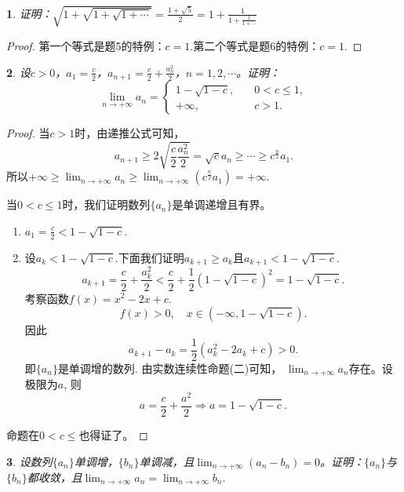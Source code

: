 \documentclass[utf8]{book}
\newtheorem{example}{}[section]             %
\begin{document}
\begin{example}
证明：$\displaystyle \sqrt{1+\sqrt{1+\sqrt{1+\cdots}}}=\frac{1+\sqrt{5}}{2} =  1 + \displaystyle \frac{1}{1+\displaystyle \frac{1}{1+\cdots}}$
\end{example}
\begin{proof}
第一个等式是题5的特例：$c=1$.第二个等式是题6的特例：$c=1$.
\end{proof}
\begin{example}
设$c>0$，$a_1=\frac{c}{2}$，$a_{n+1}=\displaystyle\frac{c}{2}+\frac{a_n^2}{2}$，$n=1,2,\cdots$。证明：
\begin{equation*}
\displaystyle \lim_{n\to +\infty}a_n=
\begin{cases}
1-\sqrt{1-c},\quad&0<c\leq 1,\\
+\infty, \quad&c > 1.
\end{cases}
\end{equation*}
\end{example}
\begin{proof}
当$c>1$时，由递推公式可知，$$a_{n+1}\geq 2\displaystyle\sqrt{\frac{c}{2}{\frac{a_n^2}{2}}}=\sqrt{c}a_n\geq \cdots\geq c^{\frac{n}{2}}a_1.$$
所以$+\infty \geq \displaystyle \lim_{n\to +\infty}a_n \geq \displaystyle \lim_{n\to +\infty}\left(c^{\frac{n}{2}}a_1\right) = +\infty.$

当$0<c\leq 1$时，我们证明数列$\{a_n\}$是单调递增且有界。
\renewcommand\labelenumi{\normalfont(\theenumi)}
\begin{enumerate}
\item $a_1 = \displaystyle\frac{c}{2} < 1-\sqrt{1-c}$.
\item 设$a_k < 1-\sqrt{1-c}$.下面我们证明$a_{k+1} \geq a_{k}$且$a_{k+1} < 1-\sqrt{1-c}$.
$$a_{k+1} = \frac{c}{2} + \frac{a_{k}^2}{2} <\frac{c}{2} + \frac{1}{2}\left(1-\sqrt{1-c}\right)^2 = 1-\sqrt{1-c}.$$
考察函数$f(x) = x^2-2x+c$. $$f(x) > 0, \quad x\in(-\infty, 1-\sqrt{1-c}).$$
因此 $$a_{k+1} - a_{k} = \frac{1}{2}(a_k^2-2a_k+c) > 0.$$
即$\{a_n\}$是单调增的数列. 由实数连续性命题(二)可知， $\displaystyle \lim_{n\to +\infty}a_n$存在。设极限为$a$, 则$$a=\frac{c}{2}+\frac{a^2}{2}\Rightarrow a = 1-\sqrt{1-c}.$$
\end{enumerate}
命题在$0<c\leq$也得证了。\end{proof}
\begin{example}
设数列$\{a_n\}$单调增，$\{b_n\}$单调减，且$\displaystyle \lim_{n\to +\infty}(a_n-b_n)=0$。证明：$\{a_n\}$与$\{b_n\}$都收敛，且$\displaystyle \lim_{n\to +\infty}a_n=\displaystyle \lim_{n\to +\infty}b_n$.
\end{example}
\end{document}
